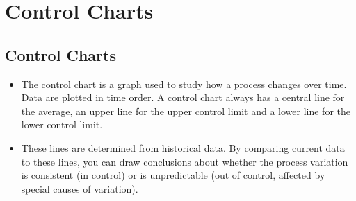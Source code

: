 \documentclass[]{article}
\title{}
\author{}
\begin{document}
\maketitle

\begin{abstract}

\end{abstract}
\tableofcontents
\newpage
\newpage
\section{Control Charts}
{
\large
}
\subsection{Control Charts}
{\large
\begin{itemize}
\item The control chart is a graph used to study how a process changes over time. Data are plotted in time order. A control chart always has a central line for the average, an upper line for the upper control limit and a lower line for the lower control limit. 
\item These lines are determined from historical data. By comparing current data to these lines, you can draw conclusions about whether the process variation is consistent (in control) or is unpredictable (out of control, affected by special causes of variation).

\end{itemize}
}
\end{document}
